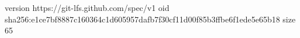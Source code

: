 version https://git-lfs.github.com/spec/v1
oid sha256:e1ce7bf8887c160364c1d605957dafb7f30cf11d00f85b3ffbe6f1ede5e65b18
size 65
